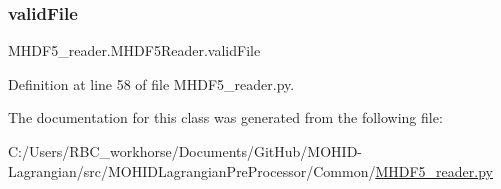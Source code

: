 \subsubsection{\texorpdfstring{valid\+File}{validFile}}
{\footnotesize\ttfamily M\+H\+D\+F5\+\_\+reader.\+M\+H\+D\+F5\+Reader.\+valid\+File}



Definition at line 58 of file M\+H\+D\+F5\+\_\+reader.\+py.



The documentation for this class was generated from the following file\+:\begin{DoxyCompactItemize}
\item 
C\+:/\+Users/\+R\+B\+C\+\_\+workhorse/\+Documents/\+Git\+Hub/\+M\+O\+H\+I\+D-\/\+Lagrangian/src/\+M\+O\+H\+I\+D\+Lagrangian\+Pre\+Processor/\+Common/\mbox{\hyperlink{_m_h_d_f5__reader_8py}{M\+H\+D\+F5\+\_\+reader.\+py}}\end{DoxyCompactItemize}
